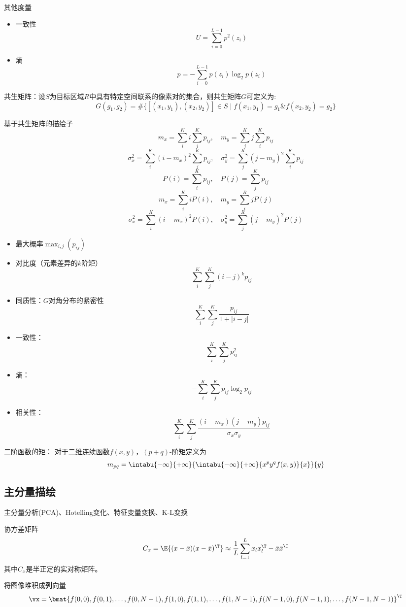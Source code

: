 其他度量
\begin{itemize}
	\item 一致性
	\[U=\sum_{i=0}^{L-1}p^2(z_i)\]
	\item 熵
	\[p=-\sum_{i=0}^{L-1}p(z_i)\log_2p(z_i)\]
\end{itemize}

共生矩阵：设$S$为目标区域$R$中具有特定空间联系的像素对的集合，则共生矩阵$G$可定义为:
\[G(g_1,g_2)=\#\{[(x_1,y_1),(x_2,y_2)]\in S\mid f(x_1,y_1)=g_1 \& f(x_2,y_2)=g_2\}\]

基于共生矩阵的描绘子
\[m_{x}=\sum_{i}^{K} i \sum_{j}^{K} p_{ij}, \quad m_{y}=\sum_{j}^{K} j \sum_{i}^{K} p_{ij}\]
\[\sigma_{x}^{2}=\sum_{i}^{K}\left(i-m_{x}\right)^{2} \sum_{j}^{K} p_{ij}, \quad \sigma_{y}^{2}=\sum_{j}^{K}\left(j-m_{y}\right)^{2} \sum_{i}^{K} p_{ij}\]
\[P(i)=\sum_{i}^{K} p_{ij}, \quad P(j)=\sum_{j}^{K} p_{ij}\]
\[m_{x}=\sum_{i}^{K} iP(i), \quad m_{y}=\sum_{i}^{R} jP(j)\]
\[\sigma_{x}^{2}=\sum_{i}^{K}\left(i-m_{x}\right)^{2} P(i), \quad \sigma_{y}^{2}=\sum_{j}^{R}\left(j-m_{y}\right)^{2} P(j)\]
\begin{itemize}
	\item 最大概率$\max_{i,j}(p_{ij})$
	\item 对比度（元素差异的$k$阶矩）
	\[\sum_i^K\sum_j^K(i-j)^kp_{ij}\]
	\item 同质性：$G$对角分布的紧密性
	\[\sum_i^K\sum_j^K \frac{p_{ij}}{1+|i-j|}\]
	\item 一致性：
	\[\sum_i^K\sum_j^K p_{ij}^2\]
	\item 熵：
	\[-\sum_i^K\sum_j^K p_{ij}\log_2 p_{ij}\]
	\item 相关性：
	\[\sum_i^K\sum_j^K\frac{(i-m_x)(j-m_y)p_{ij}}{\sigma_x\sigma_y}\]
\end{itemize}

二阶函数的矩：
对于二维连续函数$f(x,y)$，$(p+q)$-阶矩定义为
\[m_{pq}=\intabu{-\infty}{+\infty}{\intabu{-\infty}{+\infty}{x^py^qf(x,y)}{x}}{y}\]


\subsection{主分量描绘}
主分量分析(PCA)、Hotelling变化、特征变量变换、K-L变换

协方差矩阵
\[C_x=\E{(x-\bar{x})(x-\bar{x})^\T}\approx\frac{1}{L}\sum_{l=1}^Lx_lx_l^\T-\bar{x}\bar{x}^\T\]
其中$C_x$是半正定的实对称矩阵。

将图像堆积成\textbf{列}向量
\[\vx=\bmat{f(0,0), f(0,1), \ldots, f(0,N-1), f(1,0), f(1,1), \ldots, f(1,N-1), f(N-1,0), f(N-1,1), \ldots, f(N-1,N-1)}^\T\]

